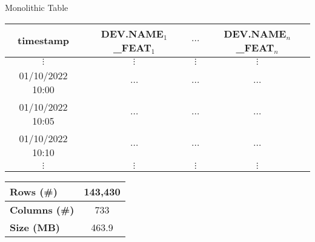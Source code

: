 \begin{frame}{Monolithic Table}
	\begin{table}[]
		\begin{center}
			\footnotesize
			\begin{tabular}[c]{c|c|c|c}
				\multicolumn{1}{c|}{\textbf{timestamp}}              &
				\multicolumn{1}{c|}{\textbf{DEV.NAME$_1$\_FEAT$_1$}} &
				\multicolumn{1}{c|}{$\ldots$}                        &
				\multicolumn{1}{c}{\textbf{DEV.NAME$_n$\_FEAT$_n$}}                                   \\
				\hline
				$\vdots$                                             & $\vdots$ & $\vdots$ & $\vdots$ \\
				01/10/2022 10:00                                     & $\ldots$ & $\ldots$ & $\ldots$ \\
				01/10/2022 10:05                                     & $\ldots$ & $\ldots$ & $\ldots$ \\
				01/10/2022 10:10                                     & $\ldots$ & $\ldots$ & $\ldots$ \\
				$\vdots$                                             & $\vdots$ & $\vdots$ & $\vdots$

			\end{tabular}
		\end{center}
	\end{table}

	\begin{table}[]
		\centering
		\begin{tabular}{l|c}
			\textbf{Rows (\#)}    & 143,430 \\
			\hline
			\textbf{Columns (\#)} & 733     \\
			\hline
			\textbf{Size (MB)}    & 463.9
		\end{tabular}

	\end{table}
\end{frame}